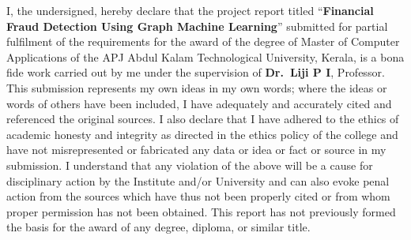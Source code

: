 \documentclass[12pt,a4paper,oneside]{report}
\begin{document}
\setlength{\parindent}{1.5em}%
\indent I, the undersigned, hereby declare that the project report titled ``\textbf{Financial Fraud Detection Using Graph Machine Learning}'' submitted for partial fulfilment of the requirements for the award of the degree of Master of Computer Applications of the APJ Abdul Kalam Technological University, Kerala, is a bona fide work carried out by me under the supervision of \textbf{Dr.\ Liji P I}, Professor. This submission represents my own ideas in my own words; where the ideas or words of others have been included, I have adequately and accurately cited and referenced the original sources. I also declare that I have adhered to the ethics of academic honesty and integrity as directed in the ethics policy of the college and have not misrepresented or fabricated any data or idea or fact or source in my submission. I understand that any violation of the above will be a cause for disciplinary action by the Institute and/or University and can also evoke penal action from the sources which have thus not been properly cited or from whom proper permission has not been obtained. This report has not previously formed the basis for the award of any degree, diploma, or similar title.
\end{document}

